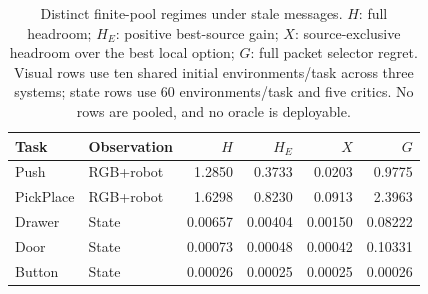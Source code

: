 \documentclass[10pt,a4paper]{article}
\begin{document}
\setcounter{table}{5}
\begin{table}[H]\centering\small
\caption{Distinct finite-pool regimes under stale messages. $H$: full headroom; $H_E$: positive best-source gain; $X$: source-exclusive headroom over the best local option; $G$: full packet selector regret. Visual rows use ten shared initial environments/task across three systems; state rows use 60 environments/task and five critics. No rows are pooled, and no oracle is deployable.}
\begin{tabular}{llrrrr}\toprule Task & Observation & $H$ & $H_E$ & $X$ & $G$\\\midrule
Push & RGB+robot & 1.2850 & 0.3733 & 0.0203 & 0.9775\\
PickPlace & RGB+robot & 1.6298 & 0.8230 & 0.0913 & 2.3963\\
Drawer & State & 0.00657 & 0.00404 & 0.00150 & 0.08222\\
Door & State & 0.00073 & 0.00048 & 0.00042 & 0.10331\\
Button & State & 0.00026 & 0.00025 & 0.00025 & 0.00026\\\bottomrule
\end{tabular}
\end{table}
\end{document}
